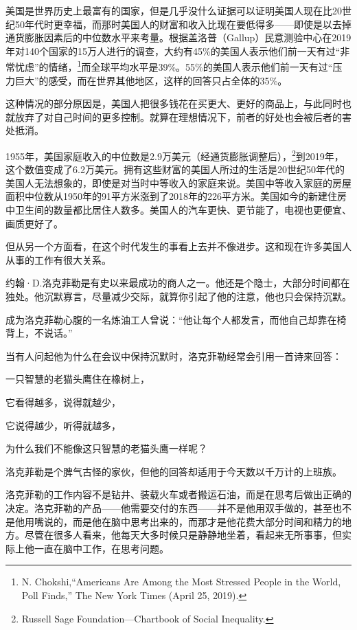美国是世界历史上最富有的国家，但是几乎没什么证据可以证明美国人现在比20世纪50年代时更幸福，而那时美国人的财富和收入比现在要低得多——即使是以去掉通货膨胀因素后的中位数水平来考量。根据盖洛普（Gallup）民意测验中心在2019年对140个国家的15万人进行的调查，大约有45\%的美国人表示他们前一天有过“非常忧虑”的情绪，\footnote{N. Chokshi,“Americans Are Among the Most Stressed People in the World, Poll Finds,” The New York Times (April 25, 2019).}而全球平均水平是39\%。55\%的美国人表示他们前一天有过“压力巨大”的感受，而在世界其他地区，这样的回答只占全体的35\%。

这种情况的部分原因是，美国人把很多钱花在买更大、更好的商品上，与此同时也就放弃了对自己时间的更多控制。就算在理想情况下，前者的好处也会被后者的害处抵消。

1955年，美国家庭收入的中位数是2.9万美元（经通货膨胀调整后），\footnote{Russell Sage Foundation—Chartbook of Social Inequality.}到2019年，这个数值变成了6.2万美元。拥有这些财富的美国人所过的生活是20世纪50年代的美国人无法想象的，即使是对当时中等收入的家庭来说。美国中等收入家庭的房屋面积中位数从1950年的91平方米涨到了2018年的226平方米。美国如今的新建住房中卫生间的数量都比居住人数多。美国人的汽车更快、更节能了，电视也更便宜、画质更好了。

但从另一个方面看，在这个时代发生的事看上去并不像进步。这和现在许多美国人从事的工作有很大关系。

约翰·D.洛克菲勒是有史以来最成功的商人之一。他还是个隐士，大部分时间都在独处。他沉默寡言，尽量减少交际，就算你引起了他的注意，他也只会保持沉默。

成为洛克菲勒心腹的一名炼油工人曾说：“他让每个人都发言，而他自己却靠在椅背上，不说话。”

当有人问起他为什么在会议中保持沉默时，洛克菲勒经常会引用一首诗来回答：

{\kaishu

一只智慧的老猫头鹰住在橡树上，

它看得越多，说得就越少，

它说得越少，听得就越多，

为什么我们不能像这只智慧的老猫头鹰一样呢？

}

洛克菲勒是个脾气古怪的家伙，但他的回答却适用于今天数以千万计的上班族。

洛克菲勒的工作内容不是钻井、装载火车或者搬运石油，而是在思考后做出正确的决定。洛克菲勒的产品——他需要交付的东西——并不是他用双手做的，甚至也不是他用嘴说的，而是他在脑中思考出来的，而那才是他花费大部分时间和精力的地方。尽管在很多人看来，他每天大多时候只是静静地坐着，看起来无所事事，但实际上他一直在脑中工作，在思考问题。

